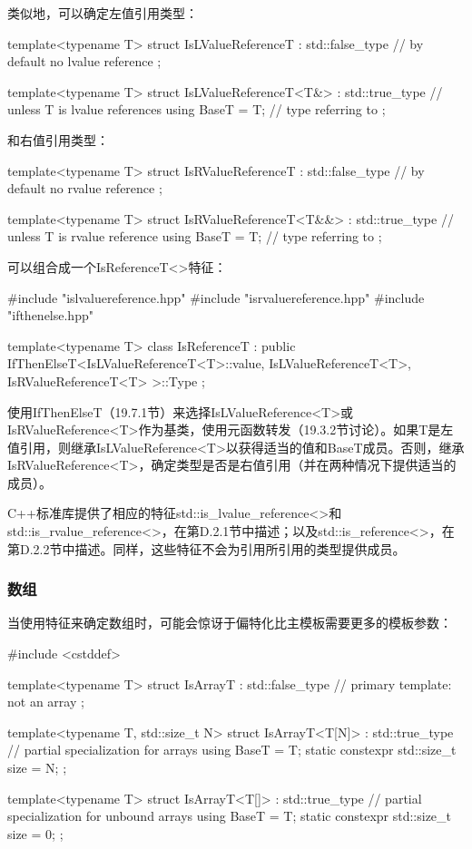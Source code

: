 类似地，可以确定左值引用类型：

\begin{cpp}
template<typename T>
struct IsLValueReferenceT : std::false_type { // by default no lvalue reference
};

template<typename T>
struct IsLValueReferenceT<T&> : std::true_type { // unless T is lvalue references
	using BaseT = T; // type referring to
};
\end{cpp}

和右值引用类型：

\begin{cpp}
template<typename T>
struct IsRValueReferenceT : std::false_type { // by default no rvalue reference
};

template<typename T>
struct IsRValueReferenceT<T&&> : std::true_type { // unless T is rvalue reference
	using BaseT = T; // type referring to
};
\end{cpp}

可以组合成一个IsReferenceT<>特征：

\begin{cpp}
#include "islvaluereference.hpp"
#include "isrvaluereference.hpp"
#include "ifthenelse.hpp"

template<typename T>
class IsReferenceT
	: public IfThenElseT<IsLValueReferenceT<T>::value,
						IsLValueReferenceT<T>,
						IsRValueReferenceT<T>
	>::Type {};
\end{cpp}

使用IfThenElseT（19.7.1节）来选择IsLValueReference<T>或IsRValueReference<T>作为基类，使用元函数转发（19.3.2节讨论）。如果T是左值引用，则继承IsLValueReference<T>以获得适当的值和BaseT成员。否则，继承IsRValueReference<T>，确定类型是否是右值引用（并在两种情况下提供适当的成员）。

C++标准库提供了相应的特征std::is\_lvalue\_reference<>和std::is\_rvalue\_reference<>，在第D.2.1节中描述；以及std::is\_reference<>，在第D.2.2节中描述。同样，这些特征不会为引用所引用的类型提供成员。

\subsubsection{数组}

当使用特征来确定数组时，可能会惊讶于偏特化比主模板需要更多的模板参数：

\begin{cpp}
#include <cstddef>

template<typename T>
struct IsArrayT : std::false_type { // primary template: not an array
};

template<typename T, std::size_t N>
struct IsArrayT<T[N]> : std::true_type { // partial specialization for arrays
	using BaseT = T;
	static constexpr std::size_t size = N;
};

template<typename T>
struct IsArrayT<T[]> : std::true_type { // partial specialization for unbound arrays
	using BaseT = T;
	static constexpr std::size_t size = 0;
};
\end{cpp}

